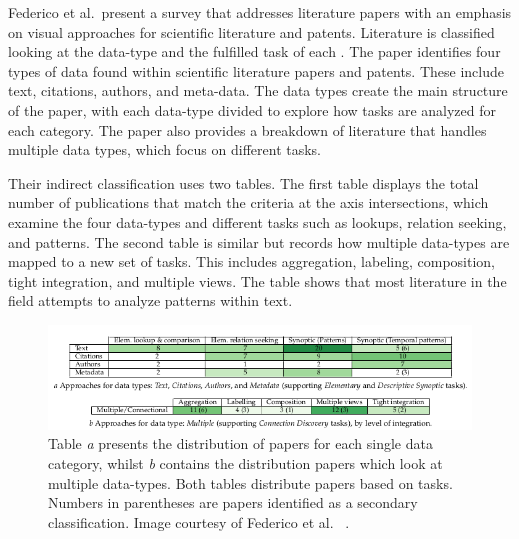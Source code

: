

Federico et al.\ present a survey that addresses literature papers with an emphasis on visual approaches for scientific literature and patents. Literature is classified looking at the data-type and the fulfilled task of each \cite{federico2016survey}.
The paper identifies four types of data found within scientific literature papers and patents. These include text, citations, authors, and meta-data. The data types create the main structure of the paper, with each data-type divided to explore how tasks are analyzed for each category. The paper also provides a breakdown of literature that handles multiple data types, which focus on different tasks.

Their indirect classification uses two tables. The first table displays the total number of publications that match the criteria at the axis intersections, which examine the four data-types and different tasks such as lookups, relation seeking, and patterns. The second table is similar but records how multiple data-types are mapped to a new set of tasks. This includes aggregation, labeling, composition, tight integration, and multiple views. The table shows that most literature in the field attempts to analyze patterns within text.

\begin{figure}[t]
\begin{center}
\includegraphics[width=1\textwidth]{images/federico2016survey}
\caption{Table \textit{a} presents the distribution of papers for each single data category, whilst \textit{b} contains the distribution papers which look at multiple data-types. Both tables distribute papers based on  tasks. Numbers in parentheses are papers identified as a secondary classification. Image courtesy of Federico et al.\ \cite{federico2016survey} .} \label{fig: federico2016survey}
\end{center}
\end{figure}

